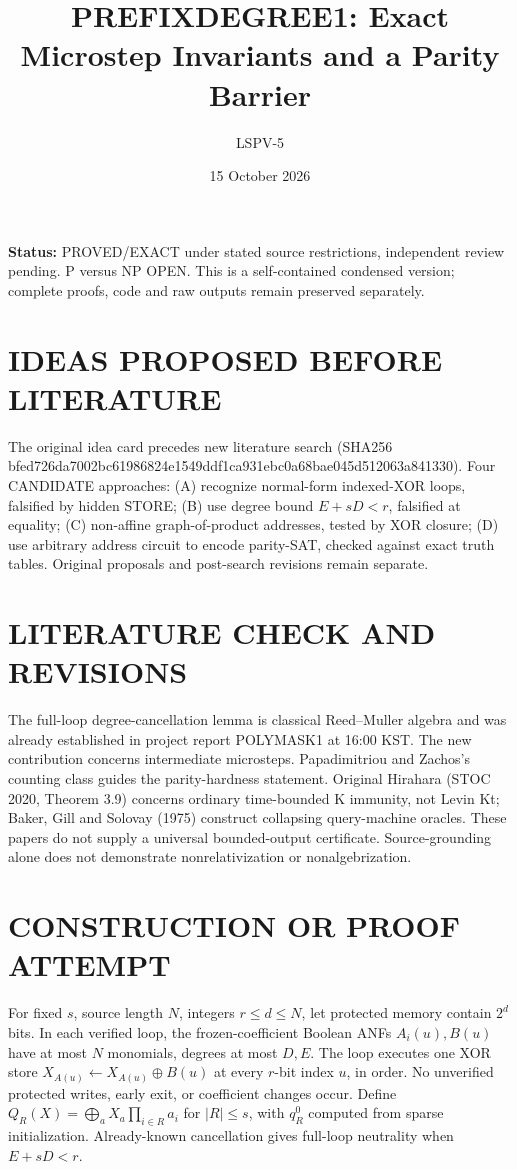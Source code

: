 \documentclass{article}
\title{PREFIXDEGREE1: Exact Microstep Invariants and a Parity Barrier}
\author{LSPV-5}
\date{15 October 2026}
\begin{document}
\maketitle
\noindent\textbf{Status:} PROVED/EXACT under stated source restrictions, independent review pending. P versus NP OPEN. This is a self-contained condensed version; complete proofs, code and raw outputs remain preserved separately.

\section{IDEAS PROPOSED BEFORE LITERATURE}
The original idea card precedes new literature search (SHA256 bfed726da7002bc61986824e1549ddf1ca931ebc0a68bae045d512063a841330). Four CANDIDATE approaches: (A) recognize normal-form indexed-XOR loops, falsified by hidden STORE; (B) use degree bound \(E+sD<r\), falsified at equality; (C) non-affine graph-of-product addresses, tested by XOR closure; (D) use arbitrary address circuit to encode parity-SAT, checked against exact truth tables. Original proposals and post-search revisions remain separate.

\section{LITERATURE CHECK AND REVISIONS}
The full-loop degree-cancellation lemma is classical Reed--Muller algebra and was already established in project report POLYMASK1 at 16:00 KST. The new contribution concerns intermediate microsteps. Papadimitriou and Zachos's counting class guides the parity-hardness statement. Original Hirahara (STOC 2020, Theorem 3.9) concerns ordinary time-bounded K immunity, not Levin Kt; Baker, Gill and Solovay (1975) construct collapsing query-machine oracles. These papers do not supply a universal bounded-output certificate. Source-grounding alone does not demonstrate nonrelativization or nonalgebrization.

\section{CONSTRUCTION OR PROOF ATTEMPT}
For fixed \(s\), source length \(N\), integers \(r\le d\le N\), let protected memory contain \(2^d\) bits. In each verified loop, the frozen-coefficient Boolean ANFs \(A_i(u), B(u)\) have at most \(N\) monomials, degrees at most \(D,E\). The loop executes one XOR store \(X_{A(u)}\gets X_{A(u)}\oplus B(u)\) at every \(r\)-bit index \(u\), in order. No unverified protected writes, early exit, or coefficient changes occur. Define
\(Q_R(X)=\bigoplus_a X_a\prod_{i\in R}a_i\) for \(|R|\le s\), with \(q_R^0\) computed from sparse initialization. Already-known cancellation gives full-loop neutrality when \(E+sD<r\).
\end{document}
